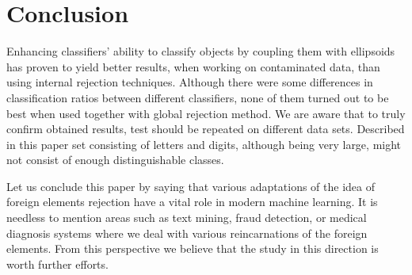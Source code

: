 \documentclass{llncs}
\begin{document}




\section{Conclusion}
  \label{sec:Conclusion}


Enhancing classifiers' ability to classify objects by coupling them with ellipsoids has proven to yield better results, when working on contaminated data, than using internal rejection techniques. Although there were some differences in classification ratios between different classifiers, none of them turned out to be best when used together with global rejection method. We are aware that to truly confirm obtained results, test should be repeated on different data sets. Described in this paper set consisting of letters and digits, although being very large, might not consist of enough distinguishable classes.

Let us conclude this paper by saying that various adaptations of the idea of foreign elements rejection have a vital role in modern machine learning. It is needless to mention areas such as text mining, fraud detection, or medical diagnosis systems where we deal with various reincarnations of the foreign elements. From this perspective we believe that the study in this direction is worth further efforts.

\end{document}
